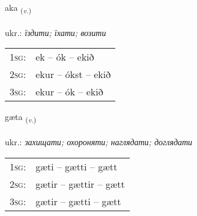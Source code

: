 \documentclass[frontgrid, backgrid]{flacards}\usepackage[]{graphicx}\usepackage[]{xcolor}
\begin{document}
\renewcommand{\blhead}{\vskip5pt {\small\bfseries\footnotesize Sagnorð | дієслово }}
\renewcommand{\bcfoot}{\vskip5pt \hspace{2pt}{\small\bfseries\footnotesize 1K}}


{aka \small{\textsubscript{(\textit{v.})}} \\[1ex] %
\textphonetic{[aːka]} \\
ukr.: \emph{їздити; їхати; возити} \\  [2ex]
\renewcommand*{\arraystretch}{0.8}
\begin{tabular}{p{1cm}l}
\textsc{1sg}: & ek -- ók -- ekið \\ 
\textsc{2sg}: & ekur -- ókst -- ekið \\ 
\textsc{3sg}: & ekur -- ók -- ekið \\ 
\end{tabular}
}

\renewcommand{\flhead}{\vskip5pt \fboxsep=0pt {\small\bfseries\footnotesize Sagnorð | дієслово}}
\renewcommand{\fcfoot}{\vskip5pt \fboxsep=0pt \hspace{2pt}{\small\bfseries\footnotesize 1K}}

\renewcommand{\blhead}{\vskip5pt {\small\bfseries\footnotesize Sagnorð | дієслово }}
\renewcommand{\bcfoot}{\vskip5pt \hspace{2pt}{\small\bfseries\footnotesize 1K}}


{gæta \small{\textsubscript{(\textit{v.})}} \\[1ex] %
\textphonetic{[caiːta]} \\
ukr.: \emph{захищати; охороняти; наглядати; доглядати} \\  [2ex]
\renewcommand*{\arraystretch}{0.8}
\begin{tabular}{p{1cm}l}
\textsc{1sg}: & gæti -- gætti -- gætt \\ 
\textsc{2sg}: & gætir -- gættir -- gætt \\ 
\textsc{3sg}: & gætir -- gætti -- gætt \\ 
\end{tabular}
}
\end{document}
